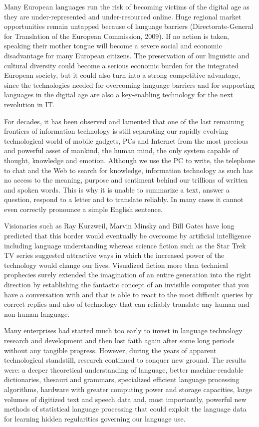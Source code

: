 \begin{multicols}{2}
Many European languages run the risk of becoming victims of the digital age as they are under-represented and under-resourced online. Huge regional market opportunities remain untapped because of language barriers (Directorate-General for Translation of the European Commission, 2009). If no action is taken, speaking their mother tongue will become a severe social and economic disadvantage for many European citizens. The preservation of our linguistic and cultural diversity could become a serious economic burden for the integrated European society, but it could also turn into a strong competitive advantage, since the technologies needed for overcoming language barriers and for supporting languages in the digital age are also a key-enabling technology for the next revolution in IT. 

For decades, it has been observed and lamented that one of the last remaining frontiers of information technology is still separating our rapidly evolving technological world of mobile gadgets, PCs and Internet from the most precious and powerful asset of mankind, the human mind, the only system capable of thought, knowledge and emotion. Although we use the PC to write, the telephone to chat and the Web to search for knowledge, information technology as such has no access to the meaning, purpose and sentiment behind our trillions of written and spoken words. This is why it is unable to summarize a text, answer a question, respond to a letter and to translate reliably. In many cases it cannot even correctly pronounce a simple English sentence.   

Visionaries such as Ray Kurzweil, Marvin Minsky and Bill Gates have long predicted that this border would eventually be overcome by artificial intelligence including language understanding whereas science fiction such as the Star Trek TV series suggested attractive ways in which the increased power of the technology would change our lives. Visualized fiction more than technical prophecies surely extended the imagination of an entire generation into the right direction by establishing the fantastic concept of an invisible computer that you have a conversation with and that is able to react to the most difficult queries by correct replies and also of technology that can reliably translate any human and non-human language.

Many enterprises had started much too early to invest in language technology research and development and then lost faith again after some long periods without any tangible progress. However, during the years of apparent technological standstill, research continued to conquer new ground. The results were: a deeper theoretical understanding of language, better machine-readable dictionaries, thesauri and grammars, specialized efficient language processing algorithms, hardware with greater computing power and storage capacities, large volumes of digitized text and speech data and, most importantly, powerful new methods of statistical language processing that could exploit the language data for learning hidden regularities governing our language use.


\end{multicols}
